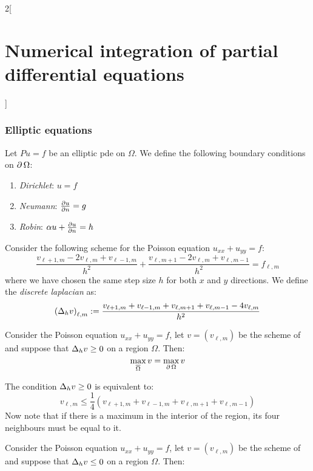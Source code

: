 \documentclass[../../../main_math.tex]{subfiles}
\begin{document}
\begin{multicols}{2}[\section{Numerical integration of partial differential equations}]
  \subsubsection{Elliptic equations}
  \begin{definition}
    Let $Pu=f$ be an elliptic pde on $\Omega$. We define the following boundary conditions on $\operatorname{\partial}{\Omega}$:
    \begin{enumerate}
      \item \emph{Dirichlet}: $u=f$
      \item \emph{Neumann}: $\pdv{u}{n}=g$
      \item \emph{Robin}: $\alpha u+\pdv{u}{n}=h$
    \end{enumerate}
  \end{definition}
  \begin{definition}
    Consider the following scheme for the Poisson equation $u_{xx}+u_{yy}=f$:
    \begin{equation}\label{NIPDE:poisson_eq}
      \frac{v_{\ell+1,m}-2v_{\ell,m}+v_{\ell-1,m}}{h^2}+\frac{v_{\ell,m+1}-2v_{\ell,m}+v_{\ell,m-1}}{h^2}\!=\!f_{\ell,m}
    \end{equation}
    where we have chosen the same step size $h$ for both $x$ and $y$ directions. We define the \emph{discrete laplacian} as:
    $$
      {(\Delta_h v)}_{\ell,m}:=\frac{v_{\ell+1,m}+v_{\ell-1,m}+v_{\ell,m+1}+v_{\ell,m-1}-4v_{\ell,m}}{h^2}
    $$
  \end{definition}
  \begin{theorem}\label{NIPDE:maximumPrinc}
    Consider the Poisson equation $u_{xx}+u_{yy}=f$, let $v=(v_{\ell,m})$ be the scheme of  and suppose that $\Delta_hv\geq 0$ on a region $\Omega$. Then:
    $$\max_{\overline{\Omega}} v=\max_{\operatorname{\partial}{\Omega}} v$$
  \end{theorem}
  \begin{sproof}
    The condition $\Delta_hv\geq 0$ is equivalent to:
    $$
      v_{\ell,m}\leq \frac{1}{4}(v_{\ell+1,m}+v_{\ell-1,m}+v_{\ell,m+1}+v_{\ell,m-1})
    $$
    Now note that if there is a maximum in the interior of the region, its four neighbours must be equal to it.
  \end{sproof}
  \begin{corollary}\label{NIPDE:minimumPrinc}
    Consider the Poisson equation $u_{xx}+u_{yy}=f$, let $v=(v_{\ell,m})$ be the scheme of  and suppose that $\Delta_hv\leq 0$ on a region $\Omega$. Then:

\end{corollary}
\end{multicols}
\end{document}
